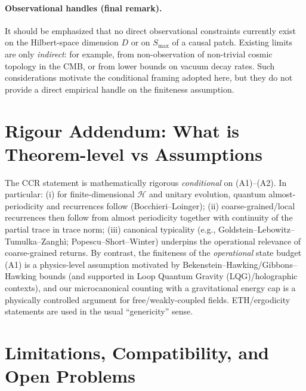 \documentclass[12pt]{article}
\newcommand{\Smax}{S_{\max}}
\theoremstyle{remark}
\begin{document}
\paragraph{Observational handles (final remark).}
It should be emphasized that no direct observational constraints currently exist on the
Hilbert-space dimension $D$ or on $\Smax$ of a causal patch. Existing limits are only
\emph{indirect}: for example, from non-observation of non-trivial cosmic topology in the CMB,
or from lower bounds on vacuum decay rates. Such considerations motivate the conditional
framing adopted here, but they do not provide a direct empirical handle on the finiteness
assumption.


\section{Rigour Addendum: What is Theorem-level vs Assumptions}\label{sec:rigour-addendum}
The CCR statement is mathematically rigorous \emph{conditional} on (A1)--(A2). In particular:
(i) for finite-dimensional $\mathcal H$ and unitary evolution, quantum almost-periodicity and recurrences follow (Bocchieri--Loinger);
(ii) coarse-grained/local recurrences then follow from almost periodicity together with continuity of the partial trace in trace norm;
(iii) canonical typicality (e.g., Goldstein--Lebowitz--Tumulka--Zangh\`i; Popescu--Short--Winter) underpins the operational relevance of coarse-grained returns.
By contrast, the finiteness of the \emph{operational} state budget (A1) is a physics-level assumption motivated by Bekenstein--Hawking/Gibbons--Hawking bounds (and supported in Loop Quantum Gravity (LQG)/holographic contexts), and our microcanonical counting with a gravitational energy cap is a physically controlled argument for free/weakly-coupled fields. ETH/ergodicity statements are used in the usual ``genericity'' sense.


\section{Limitations, Compatibility, and Open Problems}
\end{document}
